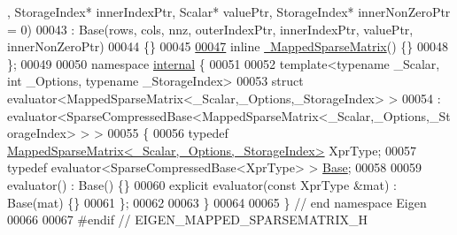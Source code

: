 \begin{DoxyCode}
      , StorageIndex* innerIndexPtr, Scalar* valuePtr, StorageIndex* innerNonZeroPtr = 0)
00043       : Base(rows, cols, nnz, outerIndexPtr, innerIndexPtr, valuePtr, innerNonZeroPtr)
00044     \{\}
00045 
\hyperlink{class_eigen_1_1_mapped_sparse_matrix_a0c36a53853f1659ea59447bcb9a20799}{00047}     \textcolor{keyword}{inline} \hyperlink{class_eigen_1_1_mapped_sparse_matrix_a0c36a53853f1659ea59447bcb9a20799}{~MappedSparseMatrix}() \{\}
00048 \};
00049 
00050 \textcolor{keyword}{namespace }\hyperlink{namespaceinternal}{internal} \{
00051 
00052 \textcolor{keyword}{template}<\textcolor{keyword}{typename} \_Scalar, \textcolor{keywordtype}{int} \_Options, \textcolor{keyword}{typename} \_StorageIndex>
00053 \textcolor{keyword}{struct }evaluator<MappedSparseMatrix<\_Scalar,\_Options,\_StorageIndex> >
00054   : evaluator<SparseCompressedBase<MappedSparseMatrix<\_Scalar,\_Options,\_StorageIndex> > >
00055 \{
00056   \textcolor{keyword}{typedef} \hyperlink{class_eigen_1_1_mapped_sparse_matrix}{MappedSparseMatrix<\_Scalar,\_Options,\_StorageIndex>}
       XprType;
00057   \textcolor{keyword}{typedef} evaluator<SparseCompressedBase<XprType> > \hyperlink{class_eigen_1_1_map_base}{Base};
00058   
00059   evaluator() : Base() \{\}
00060   \textcolor{keyword}{explicit} evaluator(\textcolor{keyword}{const} XprType &mat) : Base(mat) \{\}
00061 \};
00062 
00063 \}
00064 
00065 \} \textcolor{comment}{// end namespace Eigen}
00066 
00067 \textcolor{preprocessor}{#endif // EIGEN\_MAPPED\_SPARSEMATRIX\_H}
\end{DoxyCode}
